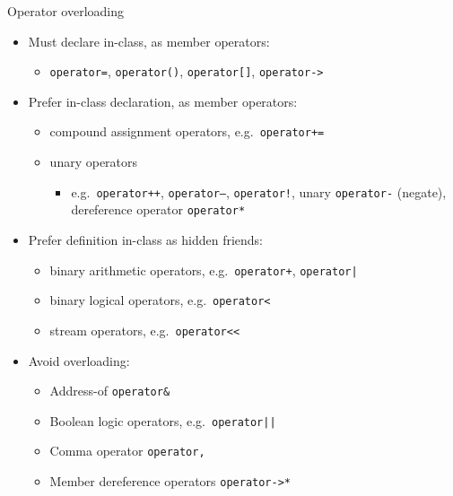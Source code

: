 \begin{frame}[fragile]
  \begin{goodpractice}{Operator overloading}
    \begin{itemize}
      \item Must declare in-class, as member operators:
      \begin{itemize}
        \item \texttt{operator=}, \texttt{operator()}, \texttt{operator[]}, \texttt{operator->}
      \end{itemize}
      \item Prefer in-class declaration, as member operators:
      \begin{itemize}
        \item compound assignment operators, e.g.\ \texttt{operator+=}
        \item unary operators
        \begin{itemize}
          \item e.g.\ \texttt{operator++}, \texttt{operator--}, \texttt{operator!}, unary \texttt{operator-} (negate), dereference operator \texttt{operator*}
        \end{itemize}
      \end{itemize}
      \item Prefer definition in-class as hidden friends:
      \begin{itemize}
        \item binary arithmetic operators, e.g.\ \texttt{operator+}, \texttt{operator|}
        \item binary logical operators, e.g.\ \texttt{operator<}
        \item stream operators, e.g.\ \texttt{operator<<}
      \end{itemize}
      \item Avoid overloading:
      \begin{itemize}
        \item Address-of \texttt{operator&}
        \item Boolean logic operators, e.g.\ \texttt{operator||}
        \item Comma operator \texttt{operator,}
        \item Member dereference operators \texttt{operator->*}
      \end{itemize}
    \end{itemize}
  \end{goodpractice}
\end{frame}
